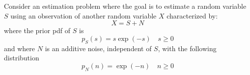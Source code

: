 \begin{solution}
 \end{solution}

\else

\question 
Consider an estimation problem where the goal is to estimate a random variable $S$ using an observation of another random variable $X$ characterized by:
$$X=S+N$$
where the prior pdf of $S$ is
$$p_S(s)=s\exp(-s) \quad s \ge 0$$
and where $N$ is an additive noise, independent of $S$, with the following distribution
$$p_N(n)=\exp(-n) \quad n\ge 0$$

